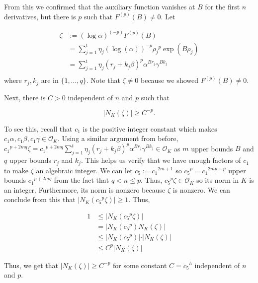 \documentclass[a4paper, 11pt]{book}
\begin{document}
From this we confirmed that the auxiliary function vanishes at $B$ for the first $n$ derivatives, but there is $p$ such that $F^{(p)}(B) \neq 0$. Let 

\begin{align*}
    \zeta &:= {(\log \alpha)}^{(-p)}F^{(p)}(B) \\
          &= \sum\limits_{j=1}^{t}\eta_{j}{\left(\log(\alpha)\right)}^{-p}{\rho_{j}}^{p}\exp(B\rho_j) \\
          &= \sum\limits_{j=1}^{t} \eta_{j}{\left(r_j + k_j \beta\right)}^{p}{\alpha}^{Br_{j}}{\gamma}^{Bk_{j}} \\
\end{align*}
where $r_j, k_j$ are in $\{1, \ldots, q\}$. Note that $\zeta \neq 0$ because we showed $F^{(p)}(B) \neq 0$.\par

Next, there is $C > 0$ independent of $n$ and $p$ such that 

\[\vert N_{K}(\zeta) \vert \geq C^{-p}.\]

To see this, recall that $c_1$ is the positive integer constant which makes $c_1\alpha, c_1\beta, c_1\gamma \in \mathcal{O}_K$. Using a similar argument from before, ${c_1}^{p+2mq} \zeta = {c_1}^{p + 2mq}\sum\limits_{j=1}^{t}{\eta_{j}\left(r_j + k_j \beta\right)}^{p}{\alpha}^{Br_{j}}{\gamma}^{Bk_{j}} \in \mathcal{O}_K$ as $m$ upper bounds $B$ and $q$ upper bounds $r_j$ and $k_j$. This helps us verify that we have enough factors of $c_1$ to make $\zeta$ an algebraic integer. We can let $c_5 := {c_1}^{2m+1}$ so ${c_5}^p = {c_1}^{2mp + p}$ upper bounds ${c_1}^{p + 2mq}$ from the fact that $q < n \leq p$. Thus, ${c_5}^{p}\zeta \in \mathcal{O}_K$ so its norm in $K$ is an integer. Furthermore, its norm is nonzero because $\zeta$ is nonzero.  We can conclude from this that $\vert N_K({c_5}^{p}\zeta) \vert \geq 1$. Thus,

\begin{align*}
    1 &\leq \vert N_K({c_5}^{p}\zeta) \vert \\
      &= \vert N_K({c_5}^{p}) N_K(\zeta) \vert \\
      &\leq \vert N_K({c_5}^{p}) \vert \cdot \vert N_K(\zeta) \vert \\
      & \leq C^{p}\vert N_K(\zeta) \vert
\end{align*}

Thus, we get that $\vert N_K(\zeta) \vert \geq C^{-p}$ for some constant $C = {c_5}^{h}$ independent of $n$ and $p$.\par
\end{document}
